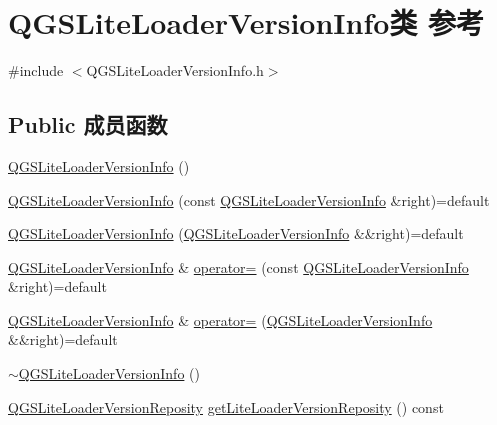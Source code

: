 \hypertarget{class_q_g_s_lite_loader_version_info}{}\section{Q\+G\+S\+Lite\+Loader\+Version\+Info类 参考}
\label{class_q_g_s_lite_loader_version_info}


{\ttfamily \#include $<$Q\+G\+S\+Lite\+Loader\+Version\+Info.\+h$>$}

\subsection*{Public 成员函数}
\begin{DoxyCompactItemize}
\item 
\mbox{\hyperlink{class_q_g_s_lite_loader_version_info_a93dcda6c14cfbd4b78ad5055af3beeec}{Q\+G\+S\+Lite\+Loader\+Version\+Info}} ()
\item 
\mbox{\hyperlink{class_q_g_s_lite_loader_version_info_acbaba954cf13c57cc1bde4a0e3fad348}{Q\+G\+S\+Lite\+Loader\+Version\+Info}} (const \mbox{\hyperlink{class_q_g_s_lite_loader_version_info}{Q\+G\+S\+Lite\+Loader\+Version\+Info}} \&right)=default
\item 
\mbox{\hyperlink{class_q_g_s_lite_loader_version_info_a68142735bfea91483f9e38340d450a51}{Q\+G\+S\+Lite\+Loader\+Version\+Info}} (\mbox{\hyperlink{class_q_g_s_lite_loader_version_info}{Q\+G\+S\+Lite\+Loader\+Version\+Info}} \&\&right)=default
\item 
\mbox{\hyperlink{class_q_g_s_lite_loader_version_info}{Q\+G\+S\+Lite\+Loader\+Version\+Info}} \& \mbox{\hyperlink{class_q_g_s_lite_loader_version_info_a3d8a63a8bcb4e92f0d2af7a95ff56ba0}{operator=}} (const \mbox{\hyperlink{class_q_g_s_lite_loader_version_info}{Q\+G\+S\+Lite\+Loader\+Version\+Info}} \&right)=default
\item 
\mbox{\hyperlink{class_q_g_s_lite_loader_version_info}{Q\+G\+S\+Lite\+Loader\+Version\+Info}} \& \mbox{\hyperlink{class_q_g_s_lite_loader_version_info_ae0050f6918afd7c675cf81ee9b3abd2d}{operator=}} (\mbox{\hyperlink{class_q_g_s_lite_loader_version_info}{Q\+G\+S\+Lite\+Loader\+Version\+Info}} \&\&right)=default
\item 
\mbox{\hyperlink{class_q_g_s_lite_loader_version_info_aa4971ae7baa0181b5eaf64a34a9ceb0b}{$\sim$\+Q\+G\+S\+Lite\+Loader\+Version\+Info}} ()
\item 
\mbox{\hyperlink{class_q_g_s_lite_loader_version_reposity}{Q\+G\+S\+Lite\+Loader\+Version\+Reposity}} \mbox{\hyperlink{class_q_g_s_lite_loader_version_info_a441a688a99461d3435e8ff902f1a6b4c}{get\+Lite\+Loader\+Version\+Reposity}} () const

\end{DoxyCompactItemize}
